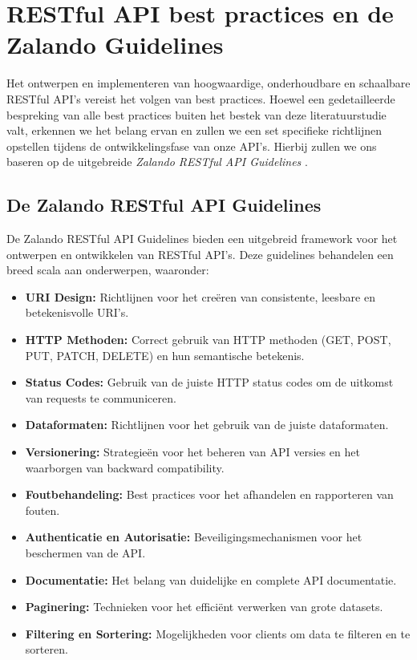\section{RESTful API best practices en de Zalando Guidelines}

Het ontwerpen en implementeren van hoogwaardige, onderhoudbare en schaalbare RESTful API's vereist het volgen van best practices. Hoewel een gedetailleerde bespreking van alle best practices buiten het bestek van deze literatuurstudie valt, erkennen we het belang ervan en zullen we een set specifieke richtlijnen opstellen tijdens de ontwikkelingsfase van onze API's. Hierbij zullen we ons baseren op de uitgebreide \textit{Zalando RESTful API Guidelines} \autocite{ZAG2024}.

\subsection{De Zalando RESTful API Guidelines}

De Zalando RESTful API Guidelines bieden een uitgebreid framework voor het ontwerpen en ontwikkelen van RESTful API's. Deze guidelines behandelen een breed scala aan onderwerpen, waaronder:

\begin{itemize}
  \item \textbf{URI Design:} Richtlijnen voor het creëren van consistente, leesbare en betekenisvolle URI's.
  \item \textbf{HTTP Methoden:} Correct gebruik van HTTP methoden (GET, POST, PUT, PATCH, DELETE) en hun semantische betekenis.
  \item \textbf{Status Codes:} Gebruik van de juiste HTTP status codes om de uitkomst van requests te communiceren.
  \item \textbf{Dataformaten:} Richtlijnen voor het gebruik van de juiste dataformaten.
  \item \textbf{Versionering:} Strategieën voor het beheren van API versies en het waarborgen van backward compatibility.
  \item \textbf{Foutbehandeling:} Best practices voor het afhandelen en rapporteren van fouten.
  \item \textbf{Authenticatie en Autorisatie:} Beveiligingsmechanismen voor het beschermen van de API.
  \item \textbf{Documentatie:} Het belang van duidelijke en complete API documentatie.
  \item \textbf{Paginering:} Technieken voor het efficiënt verwerken van grote datasets.
  \item \textbf{Filtering en Sortering:} Mogelijkheden voor clients om data te filteren en te sorteren.
\end{itemize}

